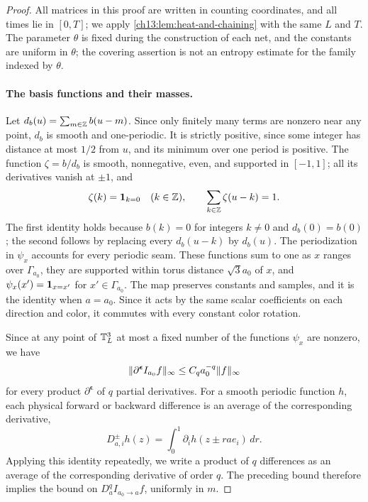 \begin{proof}
All matrices in this proof are written in counting coordinates, and all times lie in $[0,T]$; we apply \cref{ch13:lem:heat-and-chaining} with the same $L$ and $T$.  The parameter $\theta$ is fixed during the construction of each net, and the constants are uniform in $\theta$; the covering assertion is not an entropy estimate for the family indexed by $\theta$.

\paragraph{The basis functions and their masses.}
Let $d_b(u)=\sum_{m\in\mathbb Z}b(u-m)$. Since only finitely many terms are nonzero near any point, $d_b$ is smooth and one-periodic. It is strictly positive, since some integer has distance at most $1/2$ from $u$, and its minimum over one period is positive. The function $\zeta=b/d_b$ is smooth, nonnegative, even, and supported in $[-1,1]$; all its derivatives vanish at $\pm1$, and
\begin{equation}\label{ch13:eq:partition}
 \zeta(k)=\mathbf 1_{k=0}\quad(k\in\mathbb Z),\qquad\sum_{k\in\mathbb Z}\zeta(u-k)=1.
\end{equation}
The first identity holds because $b(k)=0$ for integers $k\ne0$ and $d_b(0)=b(0)$; the second follows by replacing every $d_b(u-k)$ by $d_b(u)$. The periodization in $\psi_x$ accounts for every periodic seam. These functions sum to one as $x$ ranges over $\Gamma_{a_0}$, they are supported within torus distance $\sqrt3a_0$ of $x$, and $\psi_x(x')=\mathbf 1_{x=x'}$ for $x'\in\Gamma_{a_0}$. The map preserves constants and samples, and it is the identity when $a=a_0$. Since it acts by the same scalar coefficients on each direction and color, it commutes with every constant color rotation.

Since at any point of $\mathbb T_L^3$ at most a fixed number of the functions $\psi_x$ are nonzero, we have
\[
 \lVert \partial^{\boldsymbol\epsilon}I_{a_0}f\rVert_\infty\le C_qa_0^{-q}\lVert f\rVert_\infty
\]
for every product $\partial^{\boldsymbol\epsilon}$ of $q$ partial derivatives. For a smooth periodic function $h$, each physical forward or backward difference is an average of the corresponding derivative,
\begin{equation}\label{ch13:eq:difference-average}
 D_{a,i}^{\pm}h(z)=\int_0^1\partial_ih(z\pm rae_i)\,dr.
\end{equation}
Applying this identity repeatedly, we write a product of $q$ differences as an average of the corresponding derivative of order $q$. The preceding bound therefore implies the bound on $D_a^qI_{a_0\to a}f$, uniformly in $m$.


\end{proof}
